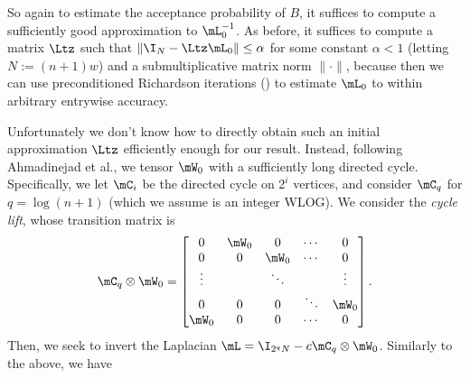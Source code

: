 \documentclass{toc}
\begin{document}
   So again to estimate the acceptance probability of $B$, it suffices to compute a sufficiently good approximation to $\mL_0^{-1}$.
   As before, it suffices to compute a matrix
   $\Ltz$ such that $\|\I_N-\Ltz \mL_0\| \leq \alpha$ for some constant $\alpha<1$ (letting $N:=(n+1)w$) and a submultiplicative matrix norm $\|\cdot\|$, because then we can use preconditioned Richardson iterations () to estimate $\mL_0$ to within arbitrary entrywise accuracy.
   
   Unfortunately %
%
%
%
%
   we don't know how to directly obtain such an initial approximation $\Ltz$ efficiently
enough for our result. Instead, following 
%
Ahmadinejad  %
et al., we tensor $\mW_0$ with a sufficiently long directed cycle.  Specifically, we let $\mC_i$ be the directed cycle on $2^i$ vertices, and consider $\mC_q$ for $q=\log(n+1)$ (which we assume is an integer WLOG). We consider the \emph{cycle lift}, whose transition matrix is
    $$\mC_q\otimes\mW_0 =
    \begin{bmatrix}
    0 & \mW_0 & 0 & \cdots & 0 \\
    0 & 0 & \mW_0 & \cdots & 0 \\
    \vdots & & \ddots & & \vdots\\
    0 & 0 & 0 & \ddots & \mW_0\\
    \mW_0 & 0 & 0 & \cdots &  0 \\
    \end{bmatrix}.$$  %
    Then, we seek to invert the Laplacian $\mL = \I_{2^qN} - c \mC_q \otimes \mW_0$.  Similarly
to the above, we have %
\end{document}
